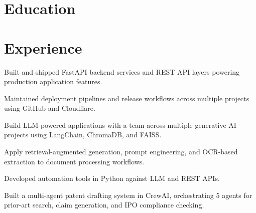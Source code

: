 \documentclass[a4paper,10pt]{article}
\begin{document}

\section{Education}
\eduschool

\section{Experience}

\begin{points}
  \item Built and shipped FastAPI backend services and REST API layers powering production application features.
  \item Maintained deployment pipelines and release workflows across multiple projects using GitHub and Cloudflare.
\end{points}
\gap

\begin{points}
  \item Build LLM-powered applications with a team across multiple generative AI projects using LangChain, ChromaDB, and FAISS.
  \item Apply retrieval-augmented generation, prompt engineering, and OCR-based extraction to document processing workflows.
\end{points}
\gap

\begin{points}
  \item Developed automation tools in Python against LLM and REST APIs.
\end{points}
\gap

\begin{points}
  \item Built a multi-agent patent drafting system in CrewAI, orchestrating 5 agents for prior-art search, claim generation, and IPO compliance checking.
\end{points}
\gap
\end{document}
